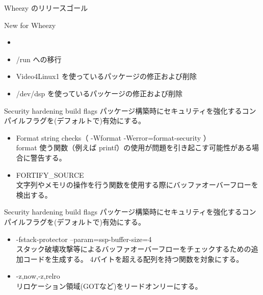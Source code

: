 \documentclass[cjk,dvipdfmx,12pt,compress,%
hyperref={bookmarks=true,bookmarksnumbered=true,bookmarksopen=false,%
  colorlinks=false,%
  pdftitle={第 66 回 関西 Debian 勉強会@KOF2012},%
  pdfauthor={佐々木洋平},%
  pdfsubject={資料},%
}]{beamer}
\begin{document}
\begin{frame}{Wheezy のリリースゴール}

New for Wheezy
\begin{itemize}

  \item {\color{red}{Security hardening build flags}}
  \item /run への移行
  \item Video4Linux1 を使っているパッケージの修正および削除
  \item /dev/dsp を使っているパッケージの修正および削除

\end{itemize}

\end{frame}


\begin{frame}{Security hardening build flags}
パッケージ構築時にセキュリティを強化するコンパイルフラグを(デフォルトで)有効にする。

\begin{itemize}
  \item Format string checks（ -Wformat -Werror=format-security ）\\
  format 使う関数（例えば printf）の使用が問題を引き起こす可能性がある場合に警告する。
  \item FORTIFY\_SOURCE \\
  文字列やメモリの操作を行う関数を使用する際にバッファオーバーフローを検出する。

\end{itemize}

\end{frame}



\begin{frame}{Security hardening build flags}
パッケージ構築時にセキュリティを強化するコンパイルフラグを(デフォルトで)有効にする。

\begin{itemize}
  \item -fstack-protector --param=ssp-buffer-size=4 \\
  スタック破壊攻撃等によるバッファオーバーフローをチェックするための追加コードを生成する。
  4バイトを超える配列を持つ関数を対象にする。
  \item -z,now,-z,relro \\
  リロケーション領域(GOTなど)をリードオンリーにする。
\end{itemize}

\end{frame}
\end{document}
